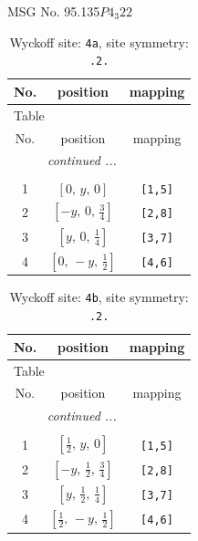 \documentclass[fleqn,8pt]{jsarticle}
\begin{document}
\setcounter{MaxMatrixCols}{32}

\renewcommand{\tablename}{Table~}
\renewcommand{\figurename}{Figure~}
\begin{center}
\LARGE
MSG No. 95.135\quad$P4_{3}22$
\end{center}
\renewcommand{\arraystretch}{1.2}
\begin{longtable}{ccc}
\caption{Wyckoff site: {\tt 4a}, site symmetry: {\tt .2.}}
 \\
 \hline \hline
No. & position & mapping \\ \hline \endfirsthead

\multicolumn{2}{l}{\tablename\ \thetable{}} \\
 \hline \hline
No. & position & mapping \\ \hline \endhead

 \hline \hline
\multicolumn{2}{r}{\footnotesize\it continued ...} \\ \endfoot

 \hline \hline
\multicolumn{2}{r}{} \\ \endlastfoot

1 & $\left[ 0,\, y,\, 0 \right]$ & {\tt [1,5]} \\ \hline
2 & $\left[ - y,\, 0,\, \frac{3}{4} \right]$ & {\tt [2,8]} \\ \hline
3 & $\left[ y,\, 0,\, \frac{1}{4} \right]$ & {\tt [3,7]} \\ \hline
4 & $\left[ 0,\, - y,\, \frac{1}{2} \right]$ & {\tt [4,6]} \\
\end{longtable}
\renewcommand{\arraystretch}{1.2}
\begin{longtable}{ccc}
\caption{Wyckoff site: {\tt 4b}, site symmetry: {\tt .2.}}
 \\
 \hline \hline
No. & position & mapping \\ \hline \endfirsthead

\multicolumn{2}{l}{\tablename\ \thetable{}} \\
 \hline \hline
No. & position & mapping \\ \hline \endhead

 \hline \hline
\multicolumn{2}{r}{\footnotesize\it continued ...} \\ \endfoot

 \hline \hline
\multicolumn{2}{r}{} \\ \endlastfoot

1 & $\left[ \frac{1}{2},\, y,\, 0 \right]$ & {\tt [1,5]} \\ \hline
2 & $\left[ - y,\, \frac{1}{2},\, \frac{3}{4} \right]$ & {\tt [2,8]} \\ \hline
3 & $\left[ y,\, \frac{1}{2},\, \frac{1}{4} \right]$ & {\tt [3,7]} \\ \hline
4 & $\left[ \frac{1}{2},\, - y,\, \frac{1}{2} \right]$ & {\tt [4,6]} \\
\end{longtable}
\end{document}
